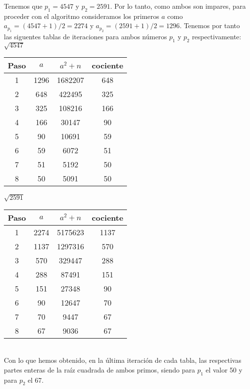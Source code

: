 \documentclass[fleqn]{article}
\begin{document}
    Tenemos que $p_1 = 4547$ y $p_2 = 2591$. Por lo tanto, como ambos son impares, para proceder con el algoritmo
    consideramos los primeros $a$ como $a_{p_1} = (4547 + 1) / 2 = 2274$ y $a_{p_2} = (2591 + 1) / 2 = 1296$. Tenemos por
    tanto las siguentes tablas de iteraciones para ambos números $p_1$ y $p_2$ respectivamente: \\

        $\sqrt{4547}$
        \begin{tabular}{| c | c | c | c |}
            \hline Paso & $a$ & $a^2 + n$ & cociente \\ \hline
            1 & 1296 & 1682207 & 648 \\
            2 & 648 & 422495 & 325 \\
            3 & 325 & 108216 & 166 \\
            4 & 166 & 30147 & 90 \\
            5 & 90 & 10691 & 59 \\
            6 & 59 & 6072 & 51 \\
            7 & 51 & 5192 & 50 \\
            8 & 50 & 5091 & 50 \\ \hline
        \end{tabular}
        $\sqrt{2591}$
        \begin{tabular}{| c | c | c | c |}
            \hline Paso & $a$ & $a^2 + n$ & cociente \\ \hline
            1 & 2274 & 5175623 & 1137 \\
            2 & 1137 & 1297316 & 570 \\
            3 & 570 & 329447 & 288 \\
            4 & 288 & 87491 & 151 \\
            5 & 151 & 27348 & 90 \\
            6 & 90 & 12647 & 70 \\
            7 & 70 & 9447 & 67 \\
            8 & 67 & 9036 & 67 \\ \hline
        \end{tabular} \\

    Con lo que hemos obtenido, en la última iteración de cada tabla, las respectivas partes enteras de la raíz cuadrada de 
    ambos primos, siendo para $p_1$ el valor 50 y para $p_2$ el 67.
\end{document}
